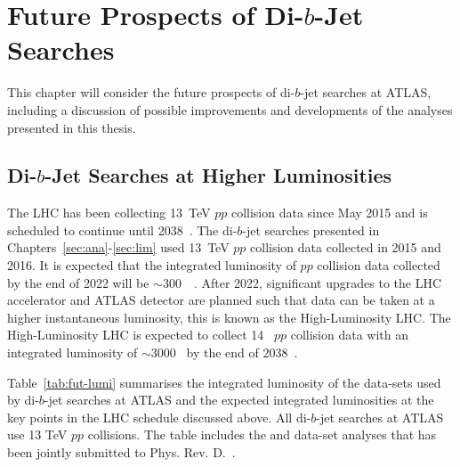 \chapter{Future Prospects of Di-$b$-Jet Searches}
\label{sec:fut}

This chapter will consider the future prospects of di-$b$-jet searches at ATLAS,
including a discussion of possible improvements and developments of the analyses presented in this thesis.

\section{Di-$b$-Jet Searches at Higher Luminosities} 

The LHC has been collecting 13~TeV $pp$ collision data since May 2015 and is scheduled to continue until 2038~\cite{fut-lhc-shedule}.
The di-$b$-jet searches presented in Chapters~\ref{sec:ana}-\ref{sec:lim} used 13~TeV $pp$ collision data collected in 2015 and 2016.
It is expected that the integrated luminosity of $pp$ collision data collected by the end of 2022 will be $\sim$300~\ifb{}~\cite{fut-lhc-shedule}.
After 2022, significant upgrades to the LHC accelerator and ATLAS detector are planned such that data can be taken at a higher instantaneous luminosity,
this is known as the High-Luminosity LHC.
The High-Luminosity LHC is expected to collect 14~\TeV{} $pp$ collision data with an integrated luminosity of $\sim$3000~\ifb{} by the end of 2038~\cite{fut-lhc-shedule}.

Table~\ref{tab:fut-lumi} summarises the integrated luminosity of the data-sets used by di-$b$-jet searches
at ATLAS and the expected integrated luminosities at the key points in the LHC schedule discussed above.
All di-$b$-jet searches at ATLAS use 13 TeV $pp$ collisions.
The table includes the \lm{} and \hm{} data-set analyses that has been jointly submitted to Phys. Rev. D.~\cite{dibjet-full}.

